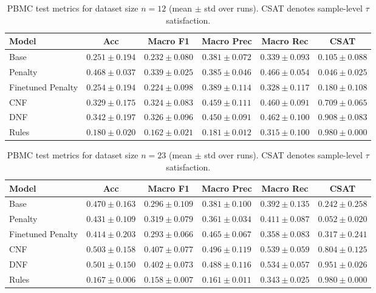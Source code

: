 \documentclass{article}
\theoremstyle{plain}
\theoremstyle{definition}
\theoremstyle{remark}
\begin{document}
\begin{table}[h]
\centering
\small
\begin{tabular}{lccccc}
\toprule
Model & Acc & Macro F1 & Macro Prec & Macro Rec & CSAT \\
\midrule
Base                         & $0.251 \pm 0.194$ & $0.232 \pm 0.080$ & $0.381 \pm 0.072$ & $0.339 \pm 0.093$ & $0.105 \pm 0.088$ \\
Penalty            & $0.468 \pm 0.037$ & $0.339 \pm 0.025$ & $0.385 \pm 0.046$ & $0.466 \pm 0.054$ & $0.046 \pm 0.025$ \\
Finetuned Penalty   & $0.254 \pm 0.194$ & $0.224 \pm 0.098$ & $0.389 \pm 0.114$ & $0.328 \pm 0.117$ & $0.180 \pm 0.108$ \\
CNF                & $0.329 \pm 0.175$ & $0.324 \pm 0.083$ & $0.459 \pm 0.111$ & $0.460 \pm 0.091$ & $0.709 \pm 0.065$ \\
DNF                & $0.342 \pm 0.197$ & $0.326 \pm 0.096$ & $0.450 \pm 0.091$ & $0.462 \pm 0.100$ & $0.908 \pm 0.083$ \\
Rules               & $0.180 \pm 0.020$ & $0.162 \pm 0.021$ & $0.181 \pm 0.012$ & $0.315 \pm 0.100$ & $0.980 \pm 0.000$ \\
\bottomrule
\end{tabular}
\caption{PBMC test metrics for dataset size $n=12$ (mean $\pm$ std over runs). CSAT denotes sample-level $\tau$ satisfaction.}
\label{tab:pbmc_test_n12}
\end{table}

\begin{table}[h]
\centering
\small
\begin{tabular}{lccccc}
\toprule
Model & Acc & Macro F1 & Macro Prec & Macro Rec & CSAT \\
\midrule
Base                         & $0.470 \pm 0.163$ & $0.296 \pm 0.109$ & $0.381 \pm 0.100$ & $0.392 \pm 0.135$ & $0.242 \pm 0.258$ \\
Penalty            & $0.431 \pm 0.109$ & $0.319 \pm 0.079$ & $0.361 \pm 0.034$ & $0.411 \pm 0.087$ & $0.052 \pm 0.020$ \\
Finetuned Penalty   & $0.414 \pm 0.203$ & $0.293 \pm 0.066$ & $0.465 \pm 0.067$ & $0.358 \pm 0.083$ & $0.317 \pm 0.241$ \\
CNF                & $0.503 \pm 0.158$ & $0.407 \pm 0.077$ & $0.496 \pm 0.119$ & $0.539 \pm 0.059$ & $0.804 \pm 0.125$ \\
DNF                & $0.501 \pm 0.150$ & $0.402 \pm 0.073$ & $0.488 \pm 0.116$ & $0.534 \pm 0.057$ & $0.951 \pm 0.026$ \\
Rules               & $0.167 \pm 0.006$ & $0.158 \pm 0.007$ & $0.161 \pm 0.011$ & $0.343 \pm 0.025$ & $0.980 \pm 0.000$ \\
\bottomrule
\end{tabular}
\caption{PBMC test metrics for dataset size $n=23$ (mean $\pm$ std over runs). CSAT denotes sample-level $\tau$ satisfaction.}
\label{tab:pbmc_test_n23}
\end{table}
\end{document}
